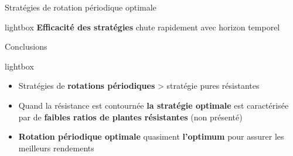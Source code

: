 \begin{frame}{ Stratégies de rotation périodique optimale}


\begin{center}
\end{center}

    \begin{beamercolorbox}[sep=0.5mm,rounded=true]{lightbox}
    \textbf{Efficacité des stratégies} chute rapidement avec
horizon temporel \\

\end{beamercolorbox}

\end{frame}






\begin{frame}{Conclusions}
 \begin{beamercolorbox}[sep=1mm,rounded=true]{lightbox}
  \begin{itemize}[itemsep=3mm]
  	
   \item Stratégies de \textbf{rotations périodiques}  >  stratégie pures résistantes
  
   \item Quand la résistance est contournée \textbf{ la stratégie optimale} est caractérisée par de \textbf{faibles ratios de plantes résistantes} (non présenté)
    \item  \textbf{Rotation périodique optimale} quasiment \textbf{l'optimum} pour assurer les meilleurs rendements
  \end{itemize}
\end{beamercolorbox}

\end{frame}


